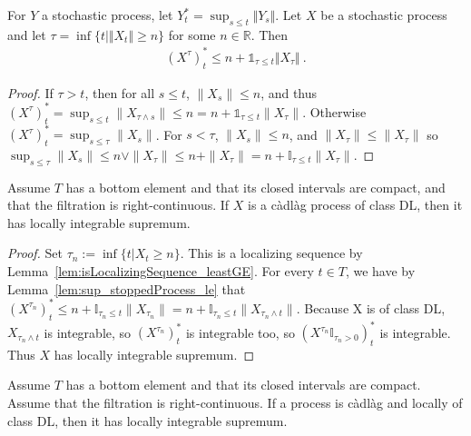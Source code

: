 \begin{lemma}\label{lem:sup_stoppedProcess_le}
  \leanok
For $Y$ a stochastic process, let $Y^*_t = \sup_{s \le t} \Vert Y_s \Vert$.
Let $X$ be a stochastic process and let $\tau = \inf \{t \mid \Vert X_t \Vert \ge n\}$ for some $n \in \mathbb{R}$.
Then
\begin{align*}
  (X^{\tau})^*_t
  \le n + \mathbb{1}_{\tau \le t} \Vert X_{\tau} \Vert
  \: .
\end{align*}
\end{lemma}

\begin{proof}\leanok
If $\tau > t$, then for all $s \le t$, $\|X_s\| \le n$, and thus $(X^\tau)^*_t = \sup_{s \le t} \|X_{\tau \land s}\| \le n = n + \mathbb{1}_{\tau \le t} \|X_{\tau}\|$. Otherwise $(X^\tau)^*_t = \sup_{s \le \tau} \|X_s\|$. For $s < \tau$, $\|X_s\| \le n$, and $\|X_\tau\| \le \|X_\tau\|$ so $\sup_{s \le \tau} \|X_s\| \le n \lor \|X_\tau\| \le n + \|X_\tau\| = n + \mathbb{I}_{\tau \le t} \|X_\tau\|$.
\end{proof}


\begin{lemma}\label{lem:ClassDL.hasLocallyIntegrableSup}
  \leanok
Assume $T$ has a bottom element and that its closed intervals are compact, and that the filtration is right-continuous.
If $X$ is a càdlàg process of class DL, then it has locally integrable supremum.
\end{lemma}

\begin{proof}\leanok
Set $\tau_n := \inf \{t | X_t \ge n\}$. This is a localizing sequence by Lemma~\ref{lem:isLocalizingSequence_leastGE}. For every $t \in T$, we have by Lemma~\ref{lem:sup_stoppedProcess_le} that $(X^{\tau_n})^*_t \le n + \mathbb{I}_{\tau_n \le t} \|X_{\tau_n}\| = n + \mathbb{I}_{\tau_n \le t} \|X_{\tau_n \land t}\|$. Because X is of class DL, $X_{\tau_n \land t}$ is integrable, so $(X^{\tau_n})^*_t$ is integrable too, so $(X^{\tau_n} \mathbb{I}_{\tau_n > 0})^*_t$ is integrable. Thus $X$ has locally integrable supremum.
\end{proof}


\begin{lemma}\label{lem:hasLocallyIntegrableSup_of_locally_classDL}
  \leanok
Assume $T$ has a bottom element and that its closed intervals are compact.
Assume that the filtration is right-continuous.
If a process is càdlàg and locally of class DL, then it has locally integrable supremum.
\end{lemma}


